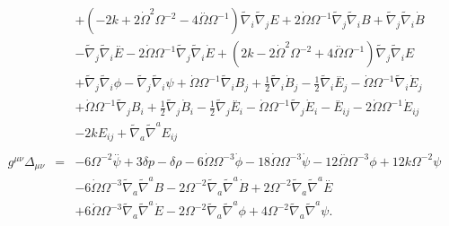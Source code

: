 \begin{eqnarray}
\nonumber\\
&&+ (-2 k + 2 \dot{\Omega}^2 \Omega^{-2} - 4 \overset{..}{\Omega} \Omega^{-1}) \tilde{\nabla}_{i}\tilde{\nabla}_{j}E + 2 \dot{\Omega} \Omega^{-1} \tilde{\nabla}_{j}\tilde{\nabla}_{i}B + \tilde{\nabla}_{j}\tilde{\nabla}_{i}\dot{B} 
\nonumber\\
&&-  \tilde{\nabla}_{j}\tilde{\nabla}_{i}\overset{..}{E} - 2 \dot{\Omega} \Omega^{-1} \tilde{\nabla}_{j}\tilde{\nabla}_{i}\dot{E} + (2 k - 2 \dot{\Omega}^2 \Omega^{-2} + 4 \overset{..}{\Omega} \Omega^{-1}) \tilde{\nabla}_{j}\tilde{\nabla}_{i}E 
\nonumber\\
&&+ \tilde{\nabla}_{j}\tilde{\nabla}_{i}\phi -  \tilde{\nabla}_{j}\tilde{\nabla}_{i}\psi +\dot{\Omega} \Omega^{-1} \tilde{\nabla}_{i}B_{j}  + \tfrac{1}{2} \tilde{\nabla}_{i}\dot{B}_{j} -  \tfrac{1}{2} \tilde{\nabla}_{i}\overset{..}{E}_{j} -  \dot{\Omega} \Omega^{-1} \tilde{\nabla}_{i}\dot{E}_{j} 
\nonumber\\
&&+ \dot{\Omega} \Omega^{-1} \tilde{\nabla}_{j}B_{i} + \tfrac{1}{2} \tilde{\nabla}_{j}\dot{B}_{i} -  \tfrac{1}{2} \tilde{\nabla}_{j}\overset{..}{E}_{i} -  \dot{\Omega} \Omega^{-1} \tilde{\nabla}_{j}\dot{E}_{i}- \overset{..}{E}_{ij}  - 2 \dot{\Omega} \Omega^{-1} \dot{E}_{ij} 
\nonumber\\
&&- 2 k E_{ij} + \tilde{\nabla}_{a}\tilde{\nabla}^{a}E_{ij}
\\  \nonumber\\ 
g^{\mu\nu}\Delta_{\mu\nu}&=& -6 \Omega^{-2} \overset{..}{\psi} + 3 \delta p -  \delta \rho - 6 \dot{\Omega} \Omega^{-3} \dot{\phi} - 18 \dot{\Omega} \Omega^{-3} \dot{\psi} - 12 \overset{..}{\Omega} \Omega^{-3} \phi + 12 k \Omega^{-2} \psi 
\nonumber\\
&&- 6 \dot{\Omega} \Omega^{-3} \tilde{\nabla}_{a}\tilde{\nabla}^{a}B  - 2 \Omega^{-2} \tilde{\nabla}_{a}\tilde{\nabla}^{a}\dot{B} + 2 \Omega^{-2} \tilde{\nabla}_{a}\tilde{\nabla}^{a}\overset{..}{E} 
\nonumber\\
&&+ 6 \dot{\Omega} \Omega^{-3} \tilde{\nabla}_{a}\tilde{\nabla}^{a}\dot{E} - 2 \Omega^{-2} \tilde{\nabla}_{a}\tilde{\nabla}^{a}\phi + 4 \Omega^{-2} \tilde{\nabla}_{a}\tilde{\nabla}^{a}\psi .
\end{eqnarray}
%
%

